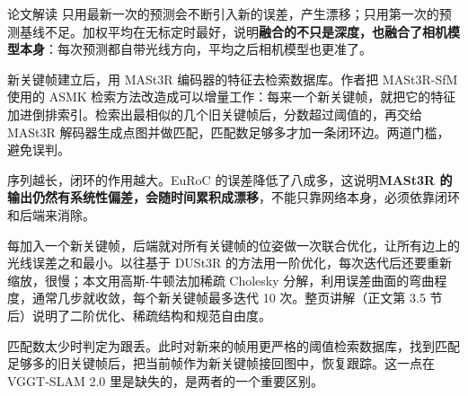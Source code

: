 \begin{interp}{论文解读}
只用最新一次的预测会不断引入新的误差，产生漂移；只用第一次的预测基线不足。加权平均在无标定时最好，说明\textbf{融合的不只是深度，也融合了相机模型本身}：每次预测都自带光线方向，平均之后相机模型也更准了。



新关键帧建立后，用 MASt3R 编码器的特征去检索数据库。作者把 MASt3R-SfM 使用的 ASMK 检索方法改造成可以增量工作：每来一个新关键帧，就把它的特征加进倒排索引。检索出最相似的几个旧关键帧后，分数超过阈值的，再交给 MASt3R 解码器生成点图并做匹配，匹配数足够多才加一条闭环边。两道门槛，避免误判。

\begin{center}
\end{center}

序列越长，闭环的作用越大。EuRoC 的误差降低了八成多，这说明\textbf{MASt3R 的输出仍然有系统性偏差，会随时间累积成漂移}，不能只靠网络本身，必须依靠闭环和后端来消除。


每加入一个新关键帧，后端就对所有关键帧的位姿做一次联合优化，让所有边上的光线误差之和最小。以往基于 DUSt3R 的方法用一阶优化，每次迭代后还要重新缩放，很慢；本文用高斯-牛顿法加稀疏 Cholesky 分解，利用误差曲面的弯曲程度，通常几步就收敛，每个新关键帧最多迭代 10 次。整页讲解（正文第 3.5 节后）说明了二阶优化、稀疏结构和规范自由度。


匹配数太少时判定为跟丢。此时对新来的帧用更严格的阈值检索数据库，找到匹配足够多的旧关键帧后，把当前帧作为新关键帧接回图中，恢复跟踪。这一点在 VGGT-SLAM 2.0 里是缺失的，是两者的一个重要区别。


\end{interp}
